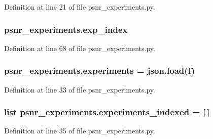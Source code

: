 Definition at line 21 of file psnr\+\_\+experiments.\+py.

\subsubsection[{\texorpdfstring{exp\+\_\+index}{exp_index}}]{\setlength{\rightskip}{0pt plus 5cm}psnr\+\_\+experiments.\+exp\+\_\+index}\hypertarget{namespacepsnr__experiments_ac658a4900340b7cee6bed9c8e0fafe26}{}\label{namespacepsnr__experiments_ac658a4900340b7cee6bed9c8e0fafe26}


Definition at line 68 of file psnr\+\_\+experiments.\+py.

\subsubsection[{\texorpdfstring{experiments}{experiments}}]{\setlength{\rightskip}{0pt plus 5cm}psnr\+\_\+experiments.\+experiments = json.\+load(f)}\hypertarget{namespacepsnr__experiments_ae848e8dc4a88ad45dc8f4fc578a145a3}{}\label{namespacepsnr__experiments_ae848e8dc4a88ad45dc8f4fc578a145a3}


Definition at line 33 of file psnr\+\_\+experiments.\+py.

\subsubsection[{\texorpdfstring{experiments\+\_\+indexed}{experiments_indexed}}]{\setlength{\rightskip}{0pt plus 5cm}list psnr\+\_\+experiments.\+experiments\+\_\+indexed = \mbox{[}$\,$\mbox{]}}\hypertarget{namespacepsnr__experiments_a6d491e2a38ac5e79f929cbe85e195d5f}{}\label{namespacepsnr__experiments_a6d491e2a38ac5e79f929cbe85e195d5f}


Definition at line 35 of file psnr\+\_\+experiments.\+py.


